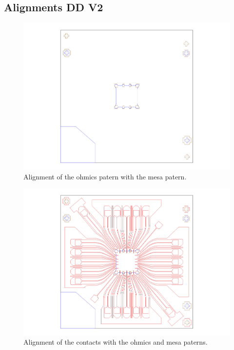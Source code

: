\subsection{Alignments DD V2}

\begin{figure} [h] \centering
\includegraphics[scale=0.3]{fig/align1_1.pdf}
\caption{Alignment of the ohmics patern with the mesa patern.} \label{align1}
\end{figure}

\begin{figure} [h] \centering
\includegraphics[scale=0.3]{fig/align2_1.pdf}
\caption{Alignment of the contacts with the ohmics and mesa paterns.} \label{align2}
\end{figure}



